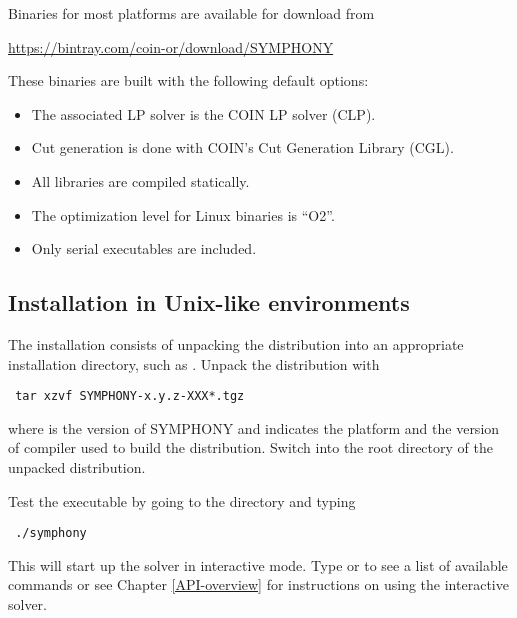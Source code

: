 Binaries for most platforms are available for download from
\begin{center}
\url{https://bintray.com/coin-or/download/SYMPHONY}  
\end{center}
These binaries are built with the following default options:
\begin{itemize}
\item The associated LP solver is the COIN LP solver (CLP).
\item Cut generation is done with COIN's Cut Generation Library (CGL).
\item All libraries are compiled statically.
\item The optimization level for Linux binaries is ``O2''. 
\item Only serial executables are included.
\end{itemize} 

\subsection{Installation in Unix-like environments}
\label{building-unix}

The installation consists of unpacking the distribution into an appropriate
installation directory, such as .
Unpack the distribution with
{\color{Brown}
\begin{verbatim}
 tar xzvf SYMPHONY-x.y.z-XXX*.tgz
\end{verbatim}
}
where  is the version of SYMPHONY and  indicates the
platform and the version of compiler used to build the distribution. Switch
into the root directory of the unpacked distribution.

Test the executable by going to the  directory and typing 
{\color{Brown}
\begin{verbatim}
 ./symphony
\end{verbatim}
}
This will start up the solver in interactive mode. Type 
or  to see a list of available commands or see Chapter
\ref{API-overview} for instructions on using the interactive solver.

